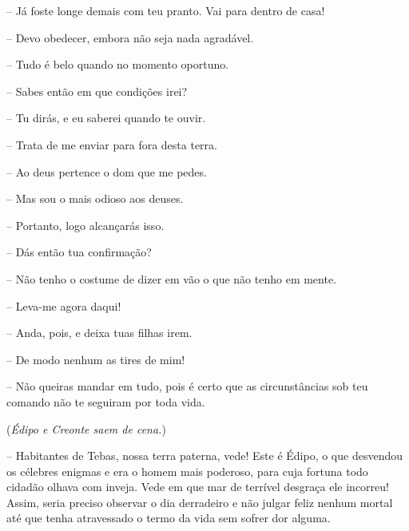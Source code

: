  --   Já foste longe demais com teu pranto. Vai para dentro de casa!

 --   Devo obedecer, embora não seja nada agradável.

 --   Tudo é belo quando no momento oportuno.

 --   Sabes então em que condições irei?

 --   Tu dirás, e eu saberei quando te ouvir.

 --   Trata de me enviar para fora desta terra.

 --   Ao deus pertence o dom que me pedes.

 --   Mas sou o mais odioso aos deuses.

 --   Portanto, logo alcançarás isso.

 --    Dás então tua confirmação?

 --   Não tenho o costume de dizer em vão o que não tenho em mente.

 --   Leva-me agora daqui!

 --   Anda, pois, e deixa tuas filhas irem.

 --   De modo nenhum as tires de mim!

 --   Não queiras mandar em tudo, pois é certo que as circunstâncias sob teu
comando não te seguiram por toda vida.

(\emph{Édipo e Creonte saem de cena.})

 --   Habitantes de Tebas, nossa terra paterna, vede! Este é Édipo, o que
desvendou os célebres enigmas e era o homem mais poderoso, para cuja
fortuna todo cidadão olhava com inveja. Vede em que mar de terrível
desgraça ele incorreu! Assim, seria preciso observar o dia derradeiro e
não julgar feliz nenhum mortal até que tenha  atravessado o termo
da vida sem sofrer dor alguma.

\endgroup %



